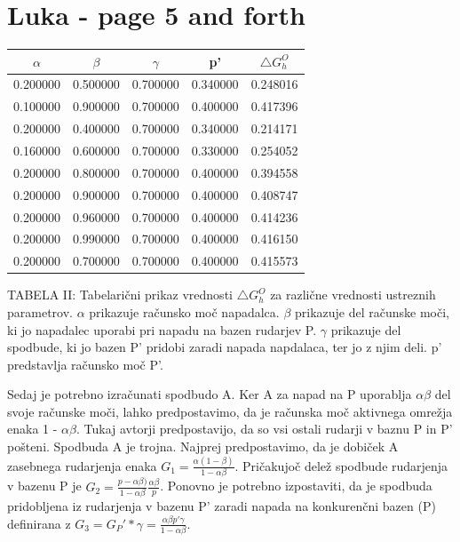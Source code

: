 \documentclass[12pt]{article}
\begin{document}
\newpage

\section{Luka - page 5 and forth}


\begin{center}
  \begin{tabular}{ | c | c | c | c | c | }
    \hline
    $\alpha$ & $\beta$ & $\gamma$ & p' & $\bigtriangleup G_h^O $  \\ \hline
    0.200000 & 0.500000 & 0.700000 & 0.340000 & 0.248016 \\ \hline
    0.100000 & 0.900000 & 0.700000 & 0.400000 & 0.417396 \\ \hline
    0.200000 & 0.400000 & 0.700000 & 0.340000 & 0.214171 \\ \hline
    0.160000 & 0.600000 & 0.700000 & 0.330000 & 0.254052 \\ \hline
    0.200000 & 0.800000 & 0.700000 & 0.400000 & 0.394558 \\ \hline
    0.200000 & 0.900000 & 0.700000 & 0.400000 & 0.408747 \\ \hline
    0.200000 & 0.960000 & 0.700000 & 0.400000 & 0.414236 \\ \hline
    0.200000 & 0.990000 & 0.700000 & 0.400000 & 0.416150 \\ \hline
    0.200000 & 0.700000 & 0.700000 & 0.400000 & 0.415573 \\ \hline
  \end{tabular}
\end{center}
TABELA II: Tabelarični prikaz vrednosti $\bigtriangleup G_h^O $ za različne vrednosti ustreznih parametrov. $\alpha$ prikazuje računsko moč napadalca. $\beta$ prikazuje del računske moči, ki jo napadalec uporabi pri napadu na bazen rudarjev P. $\gamma$ prikazuje del spodbude, ki jo bazen P' pridobi zaradi napada napdalaca, ter jo z njim deli. p' predstavlja računsko moč P'.
\newline
\newline

Sedaj je potrebno izračunati spodbudo A. Ker A za napad na P uporablja $\alpha\beta$ del svoje računske moči, lahko predpostavimo, da je računska moč aktivnega omrežja enaka 1 - $\alpha\beta$. Tukaj avtorji predpostavijo\cite{originalarticle}, da so vsi ostali rudarji v baznu P in P' pošteni. Spodbuda A je trojna. Najprej predpostavimo, da je dobiček A zasebnega rudarjenja enaka $ G_1 = \frac{\alpha(1 - \beta)}{ 1 - \alpha\beta}$. Pričakujoč delež spodbude rudarjenja v bazenu P je $ G_2 = \frac{p - \alpha\beta)}{ 1 - \alpha\beta} \frac{\alpha\beta}{p}$. Ponovno je potrebno izpostaviti, da je spodbuda pridobljena iz rudarjenja v bazenu P' zaradi napada na konkurenčni bazen (P) definirana z $ G_3 = G_P' * \gamma = \frac{\alpha\beta p' \gamma}{1 - \alpha\beta} $. 
\end{document}
